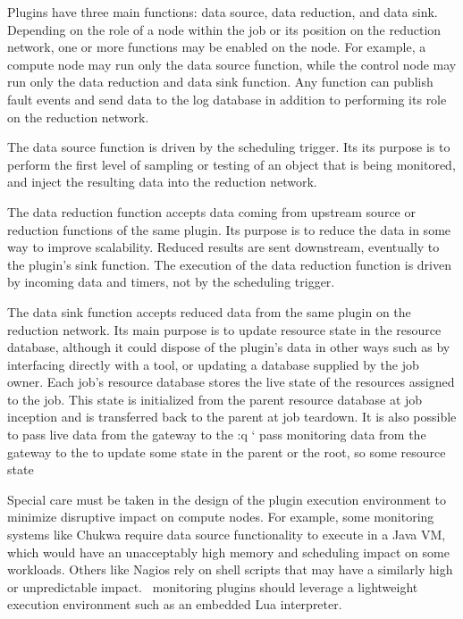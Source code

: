 Plugins have three main functions: data source, data reduction,
and data sink.  Depending on the role of a node within the job or
its position on the reduction network,
one or more functions may be enabled on the node.
For example, a compute node may run only the data source function,
while the control node may run only the data reduction and data sink function.
Any function can publish fault events and send data to the log database
in addition to performing its role on the reduction network.

The data source function is driven by the scheduling trigger.
Its its purpose is to perform the first level of sampling or testing
of an object that is being monitored, and inject the resulting data 
into the reduction network.

The data reduction function accepts data coming from upstream source or
reduction functions of the same plugin.
Its purpose is to reduce the data in some way to improve scalability.
Reduced results are sent downstream, eventually to the plugin's sink function.
The execution of the data reduction function is driven by
incoming data and timers, not by the scheduling trigger.

The data sink function accepts reduced data from the same plugin on
the reduction network.
Its main purpose is to update resource state in the resource database,
although it could dispose of the plugin's data in other ways such as by
interfacing directly with a tool, or updating a database supplied by the
job owner.  Each job's resource database stores the live state of the resources
assigned to the job.  This state is initialized from the parent resource
database at job inception and is transferred back to the parent at
job teardown.  It is also possible to pass live data from the gateway
to the :q
`
pass monitoring data from the gateway to the 
to update some state in the parent or the root, so some resource state

Special care must be taken in the design of the plugin execution
environment to minimize disruptive impact on compute nodes.
For example, some monitoring systems like Chukwa\cite{Chukwa} require
data source functionality to execute in a Java VM, which would have an
unacceptably high memory and scheduling impact on some workloads.
Others like Nagios\cite{Nagios} rely on shell scripts that may have a
similarly high or unpredictable impact.
\ngrm\ monitoring plugins should leverage a lightweight execution environment
such as an embedded Lua\cite{LuaBook} interpreter.

